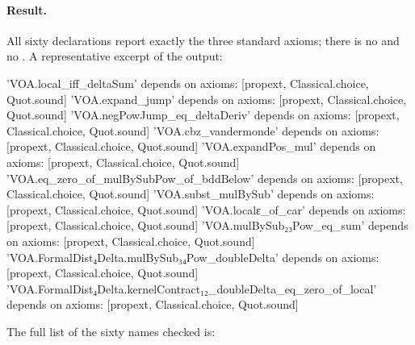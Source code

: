 \paragraph{Result.} All sixty declarations report exactly the three standard axioms; there is no  and no
. A representative excerpt of the output:
\begin{plaincode}
'VOA.local_iff_deltaSum' depends on axioms: [propext, Classical.choice, Quot.sound]
'VOA.expand_jump' depends on axioms: [propext, Classical.choice, Quot.sound]
'VOA.negPowJump_eq_deltaDeriv' depends on axioms: [propext, Classical.choice, Quot.sound]
'VOA.cbz_vandermonde' depends on axioms: [propext, Classical.choice, Quot.sound]
'VOA.expandPos_mul' depends on axioms: [propext, Classical.choice, Quot.sound]
'VOA.eq_zero_of_mulBySubPow_of_bddBelow' depends on axioms: [propext, Classical.choice, Quot.sound]
'VOA.subst_mulBySub' depends on axioms: [propext, Classical.choice, Quot.sound]
'VOA.localε_of_car' depends on axioms: [propext, Classical.choice, Quot.sound]
'VOA.mulBySub₂₃Pow_eq_sum' depends on axioms: [propext, Classical.choice, Quot.sound]
'VOA.FormalDist₄Delta.mulBySub₃₄Pow_doubleDelta' depends on axioms: [propext, Classical.choice, Quot.sound]
'VOA.FormalDist₄Delta.kernelContract₁₂_doubleDelta_eq_zero_of_local' depends on axioms: [propext,
 Classical.choice,
 Quot.sound]
\end{plaincode}
The full list of the sixty names checked is:
